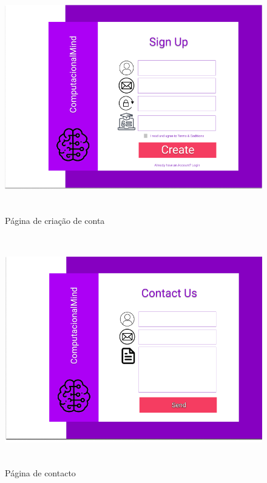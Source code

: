 \documentclass[11pt,a4paper]{report}
\begin{document}
\begin{figure}[H]
\centering
\includegraphics[width = 14cm,height = 10cm]{MockSingUp.png}
\caption{Página de criação de conta}
\label{fig:MockSingUp}
\end{figure}

\begin{figure}[H]
\centering
\includegraphics[width = 14cm,height = 10cm]{MockContactUs.png}
\caption{Página de contacto}
\label{fig:MockContactUs}
\end{figure}
\end{document}
